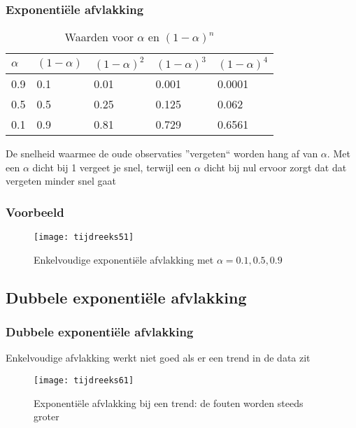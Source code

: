 \documentclass[aspectratio=169]{beamer}
\begin{document}
\begin{frame}
  \frametitle{Exponentiële afvlakking}
  
  \begin{table}
    \centering
    \begin{tabular}{l|llll}
      $\alpha$ & $(1-\alpha)$ & $(1-\alpha)^{2}$ & $(1-\alpha)^{3}$ & $(1-\alpha)^{4}$ \\ \hline
      0.9   & 0.1       & 0.01             & 0.001                      & 0.0001           \\
      0.5   & 0.5       & 0.25             & 0.125                      & 0.062            \\
      0.1   & 0.9       & 0.81             & 0.729                      & 0.6561           \\
    \end{tabular}
    \caption{Waarden voor $\alpha$ en $(1-\alpha)^{n}$}
    \label{tab:alpha}
  \end{table}
  De snelheid waarmee de oude observaties ''vergeten`` worden hang af van $\alpha$. Met een $\alpha$ dicht bij 1 vergeet je snel, terwijl een $\alpha$ dicht bij nul ervoor zorgt dat dat vergeten minder snel gaat
\end{frame}


\begin{frame}
  \frametitle{Voorbeeld}
  \begin{figure}[htbp]
    \centering
    \texttt{[image: tijdreeks51]}
    \caption{Enkelvoudige exponentiële afvlakking met $\alpha=0.1 , 0.5, 0.9$}
    \label{fig:tijdreeks51}
  \end{figure}
\end{frame}

\subsection{Dubbele exponenti\"ele afvlakking}

\begin{frame}
  \frametitle{Dubbele exponenti\"ele afvlakking}
  
  Enkelvoudige afvlakking werkt niet goed als er een trend in de data zit
  
  \begin{figure}
    \centering
    \texttt{[image: tijdreeks61]}
    \caption{Exponenti\"ele afvlakking bij een trend: de fouten worden steeds groter}
    \label{fig:tijdreeks61}
  \end{figure}
  
\end{frame}
\end{document}
